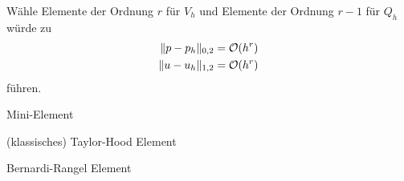 Wähle Elemente der Ordnung $r$ für $V_h$ und Elemente der Ordnung $r-1$ für $Q_h$ würde zu 
\begin{align*}
	\Vert p-p_h\Vert_{0,2}&=\mathcal{O}(h^r)\\
	\Vert u-u_h\Vert_{1,2}&=\mathcal{O}(h^r)
\end{align*}
führen.

\begin{beispiel}\enter
	Mini-Element
	
	(klassisches) Taylor-Hood Element
	
	Bernardi-Rangel Element
\end{beispiel}


